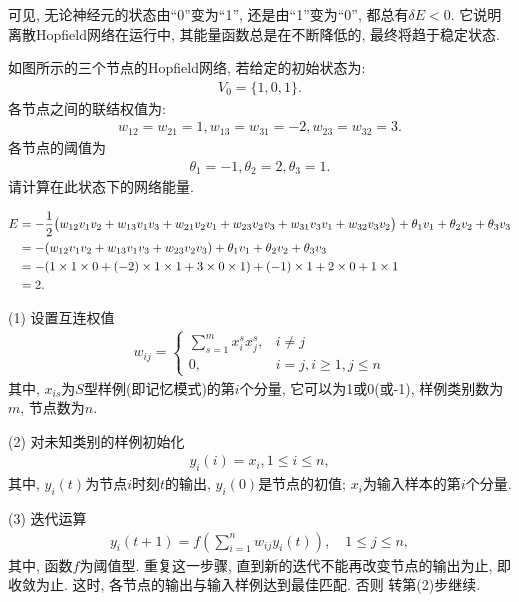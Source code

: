 可见, 无论神经元的状态由“0”变为“1”, 还是由“1”变为“0”, 都总有$\delta E<0$. 它说明离散Hopfield网络在运行中, 其能量函数总是在不断降低的, 最终将趋于稳定状态.
\begin{example}
如图所示的三个节点的Hopfield网络, 若给定的初始状态为:
\begin{align*}
    V_0=\{1,0,1\}.
\end{align*}
各节点之间的联结权值为:
\begin{align*}
     w_{12}=w_{21}=1, w_{13}=w_{31}=-2, w_{23}=w_{32}=3.
\end{align*}
各节点的阈值为
\begin{align*}
    \theta_1=-1, \theta_2=2, \theta_3=1.
\end{align*}
请计算在此状态下的网络能量.
\end{example}
\begin{result}
\begin{align}
E&=-\frac 1 2 \big(w_{12}v_1v_2+w_{13}v_1v_3+w_{21}v_2 v_1+w_{23}v_2v_3+w_{31}v_3v_1+w_{32}v_3 v_2\big)+ \theta_1 v_1+ \theta_2v_2+ \theta_3v_3\notag\\
    &= -(w_{12}v_1v_2+w_{13}v_1v_3+w_{23}v_2v_3)+ \theta_1v_1+\theta_2v_2+\theta_3v_3\notag\\
    &=-(1\times 1\times 0+(-2)\times 1\times 1+3\times 0\times 1)+(-1) \times 1+2\times 0+1\times 1\notag\\
    &=2.
\end{align}

(1) 设置互连权值
\begin{align}
  w_{i j}=\left\{\begin{array}{ll}{\sum_{s=1}^{m} x_{i}^{s} x_{j}^{s},} & {i \neq j} \\ {0,} & {i=j, i \geq 1, j \leq n}\end{array}\right.
\end{align}
其中, $x_{is}$为$S$型样例(即记忆模式)的第$i$个分量, 它可以为1或0(或-1), 样例类别数为$m$, 节点数为$n$.

(2) 对未知类别的样例初始化
\begin{align}
    y_{i}(i)=x_{i}, 1 \leq i \leq n,
\end{align}
其中, $y_i(t)$为节点$i$时刻$t$的输出, $y_i(0)$是节点的初值; $x_i$为输入样本的第$i$个分量.

(3) 迭代运算
\begin{align}
    y_{i}(t+1)=f\left(\sum_{i=1}^{n} w_{i j} y_{i}(t)\right), \quad 1 \leq j \leq n,
\end{align}
其中, 函数$f$为阈值型. 重复这一步骤, 直到新的迭代不能再改变节点的输出为止, 即收敛为止. 这时, 各节点的输出与输入样例达到最佳匹配. 否则 转第(2)步继续.
\end{result}
